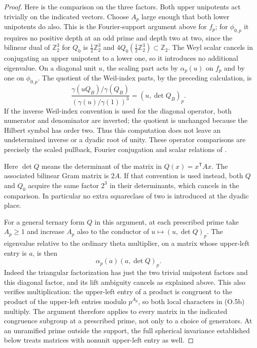 \begin{proof}
Here is the comparison on the three factors. Both upper unipotents
act trivially on the indicated vectors. Choose $A_p$ large enough
that both lower unipotents do also. This is the Fourier-support
argument above for $f_p$; for $\phi_{0,p}$ it requires no positive
depth at an odd prime and depth two at two, since the bilinear dual
of $\mathbb Z_2^3$ for $Q_0$ is $\tfrac12\mathbb Z_2^3$ and
$4Q_0(\tfrac12\mathbb Z_2^3)\subset\mathbb Z_2$.
The Weyl scalar cancels in conjugating an upper unipotent to a
lower one, so it introduces no additional eigenvalue. On a
diagonal unit $u$, the scaling part acts by $\alpha_p(u)$ on
$f_p$ and by one on $\phi_{0,p}$. The quotient of the Weil-index
parts, by the preceding calculation, is
\[
 \frac{\gamma(uQ_B)/\gamma(Q_B)}
      {(\gamma(u)/\gamma(1))^3}
       =(u,\det Q_B)_p.                                      \tag{O.5a}
\]
If the inverse Weil-index convention is used for the diagonal
operator, both numerator and denominator are inverted; the
quotient is unchanged because the Hilbert symbol has order two.
Thus this computation does not leave an undetermined inverse
or a dyadic root of unity. These operator comparisons are precisely
the scaled pullback, Fourier conjugation and scalar relations of
\cite[I.13--I.14 and II.25--II.28]{weil}.

Here $\det Q$ means the determinant of the matrix in
$Q(x)=x^{\mathsf T}Ax$. The associated bilinear Gram matrix is
$2A$. If that convention is used instead, both $Q$ and $Q_0$
acquire the same factor $2^3$ in their determinants, which cancels
in the comparison. In particular no extra squareclass of two
is introduced at the dyadic place.

For a general ternary form $Q$ in this argument, at each prescribed
prime take $A_p\ge1$ and increase $A_p$
also to the conductor of $u\mapsto(u,\det Q)_p$. The eigenvalue
relative to the ordinary theta multiplier, on a matrix whose
upper-left entry is $a$, is then
\[
                    \alpha_p(a)(a,\det Q)_p.                  \tag{O.5b}
\]
Indeed the triangular factorization has just the two trivial
unipotent factors and this diagonal factor, and its lift ambiguity
cancels as explained above. This also verifies multiplication:
the upper-left entry of a product is congruent to the product
of the upper-left entries modulo $p^{A_p}$, so both local
characters in (O.5b) multiply. The argument therefore applies
to every matrix in the indicated congruence subgroup at a prescribed
prime, not only to a choice of generators. At an unramified prime
outside the support, the full spherical invariance established
below treats matrices with nonunit upper-left entry as well.


\end{proof}
